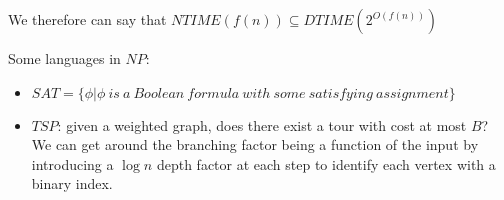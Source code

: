 We therefore can say that $NTIME(f(n)) \subseteq DTIME(2^{O(f(n))})$


Some languages in $NP$:
\begin{itemize}
	\item $SAT = \{\phi | \phi \ is \ a \ Boolean \ formula \ with\ some \ satisfying \ assignment  \}$
	\item $TSP$: given a weighted graph, does there exist a tour with cost at most $B$?  We can get around the branching factor being a function of the input by introducing a $\log n$ depth factor at each step to identify each vertex with a binary index.
	
\end{itemize}







